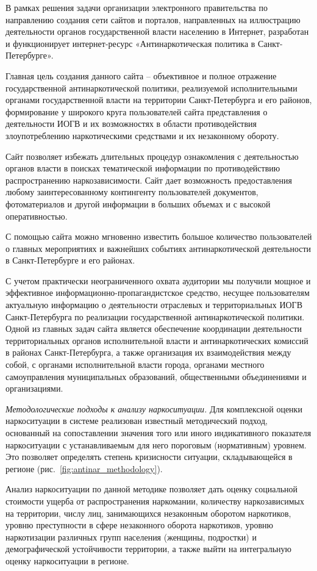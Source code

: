 В рамках решения задачи организации электронного правительства по направлению
создания сети сайтов и порталов, направленных на иллюстрацию деятельности
органов государственной власти населению в Интернет, разработан и функционирует
интернет-ресурс «Антинаркотическая политика в Санкт-Петербурге».

Главная цель создания данного сайта – объективное и полное отражение
государственной антинаркотической политики, реализуемой исполнительными органами
государственной власти на территории Санкт-Петербурга и его районов,
формирование у широкого круга пользователей сайта представления о деятельности
ИОГВ и их возможностях в области противодействия злоупотреблению наркотическими
средствами и их незаконному обороту.

Сайт позволяет избежать длительных процедур ознакомления с деятельностью органов
власти в поисках тематической информации по противодействию распространению
наркозависимости. Сайт дает возможность предоставления любому заинтересованному
контингенту пользователей документов, фотоматериалов и другой информации в
больших объемах и с высокой оперативностью. 

С помощью сайта можно мгновенно известить большое количество пользователей о
главных мероприятиях и важнейших событиях антинаркотической деятельности в
Санкт-Петербурге и его районах.

С учетом практически неограниченного охвата аудитории мы получили мощное и
эффективное информационно-пропагандистское средство, несущее пользователям
актуальную информацию о деятельности отраслевых и территориальных ИОГВ
Санкт-Петербурга по реализации государственной антинаркотической политики. 
Одной из главных задач сайта является обеспечение координации деятельности
территориальных органов исполнительной власти и антинаркотических комиссий в
районах Санкт-Петербурга, а также организация их взаимодействия между собой, с
органами исполнительной власти города, органами местного самоуправления
муниципальных образований, общественными объединениями и организациями.

\textit{Методологические подходы к анализу наркоситуации.}
Для комплексной оценки наркоситуации в системе реализован известный методический
подход, основанный на сопоставлении значения того или иного индикативного
показателя наркоситуации с устанавливаемым для него пороговым (нормативным)
уровнем. Это позволяет определять степень кризисности ситуации, складывающейся в
регионе (рис.~\ref{fig:antinar_methodology}). 

Анализ наркоситуации по данной методике позволяет дать оценку социальной
стоимости ущерба от распространения наркомании, количеству наркозависимых на
территории, числу лиц, занимающихся незаконным оборотом наркотиков, уровню
преступности в сфере незаконного оборота наркотиков, уровню наркотизации
различных групп населения (женщины, подростки) и демографической устойчивости
территории, а также выйти на интегральную оценку наркоситуации в регионе. 

